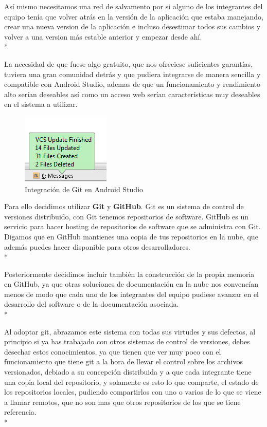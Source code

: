 \documentclass[../pfc.tex]{subfiles}
\begin{document}
	Así mismo necesitamos una red de salvamento por si alguno de los integrantes del equipo tenía que volver atrás en la versión de la aplicación que estaba manejando, crear una nueva version de la aplicación e incluso desestimar todos sus cambios y volver a una version más estable anterior y empezar desde ahí.\\*
		
	La necesidad de que fuese algo gratuito, que nos ofreciese suficientes garantías, tuviera una gran comunidad detrás y que pudiera integrarse de manera sencilla y compatible con Android Studio, ademas de que un funcionamiento y rendimiento alto serían deseables así como un acceso web serían características muy deseables en el sistema a utilizar.  
	
	\begin{figure}[H]
		\centering
		\includegraphics[width=0.4\linewidth]{../images/VCS}
		\caption{Integración de Git en Android Studio}
		\label{fig:VCS}
	\end{figure}

	Para ello decidimos utilizar \textbf{Git} y \textbf{GitHub}.
	Git es un sistema de control de versiones distribuido, con Git tenemos repositorios de software. GitHub es un servicio para hacer hosting de repositorios de software que se administra con Git. Digamos que en GitHub mantienes una copia de tus repositorios en la nube, que además puedes hacer disponible para otros desarrolladores\cite{gitexplicacion}.\\* 
	
	Posteriormente decidimos incluir también la construcción de la propia memoria en GitHub, ya que otras soluciones de documentación en la nube nos convencían menos de modo que cada uno de los integrantes del equipo pudiese avanzar en el desarrollo del software o de la documentación asociada.\\*
	
	Al adoptar git, abrazamos este sistema con todas sus virtudes y sus defectos, al principio si ya has trabajado con otros sistemas de control de versiones, debes desechar estos conocimientos, ya que tienen que ver muy poco con el funcionamiento que tiene git a la hora de llevar el control sobre los archivos versionados, debiado a su concepción distribuida y a que cada integrante tiene una copia local del repositorio, y solamente es esto lo que comparte, el estado de los repositorios locales, pudiendo compartirlos con uno o varios de lo que se viene a llamar remotos, que no son mas que otros repositorios de los que se tiene referencia.\\*
	
\end{document}
